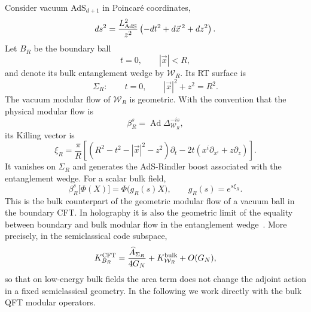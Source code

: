 \documentclass[a4paper,11pt]{article}
\theoremstyle{definition}
\begin{document}
Consider vacuum AdS$_{d+1}$ in Poincar\'e coordinates,
\begin{equation}
    ds^2
    =
    \frac{L_{\rm AdS}^2}{z^2}
    \left(
        -dt^2+d\vec{x}^{\,2}+dz^2
    \right).
    \label{eq:ads-poincare-metric}
\end{equation}
Let $B_R$ be the boundary ball
\begin{equation}
    t=0,
    \qquad
    |\vec{x}|<R,
\end{equation}
and denote its bulk entanglement wedge by $\mathcal W_R$. Its RT surface is
\begin{equation}
    \Sigma_R:
    \qquad
    t=0,
    \qquad
    |\vec{x}|^2+z^2=R^2.
\end{equation}
The vacuum modular flow of $\mathcal W_R$ is geometric. With the convention
that the physical modular flow is
\begin{equation}
    \beta_R^s
    =
    \operatorname{Ad}\Delta_{\mathcal W_R}^{-is},
\end{equation}
its Killing vector is
\begin{equation}
    \xi_R
    =
    \frac{\pi}{R}
    \left[
        \left(
            R^2-t^2-|\vec{x}|^2-z^2
        \right)\partial_t
        -
        2t
        \left(
            x^i\partial_{x^i}+z\partial_z
        \right)
    \right].
    \label{eq:bulk-ball-modular-vector}
\end{equation}
It vanishes on $\Sigma_R$ and generates the AdS-Rindler boost associated
with the entanglement wedge. For a scalar bulk field,
\begin{equation}
    \beta_R^s\bigl[\Phi(X)\bigr]
    =
    \Phi\bigl(g_R(s)X\bigr),
    \qquad
    g_R(s)=e^{s\xi_R}.
    \label{eq:bulk-modular-geometric}
\end{equation}
This is the bulk counterpart of the geometric modular flow of a vacuum
ball in the boundary CFT. In holography it is also the geometric limit of
the equality between boundary and bulk modular flow in the entanglement
wedge~\cite{JLMS2016,FaulknerLewkowycz2017}. More precisely, in the
semiclassical code subspace,
\begin{equation}
    K_{B_R}^{\rm CFT}
    =
    \frac{\widehat A_{\Sigma_R}}{4G_N}
    +
    K_{\mathcal W_R}^{\rm bulk}
    +O(G_N),
    \label{eq:JLMS-ball}
\end{equation}
so that on low-energy bulk fields the area term does not change the
adjoint action in a fixed semiclassical geometry. In the following we
work directly with the bulk QFT modular operators.
\end{document}
